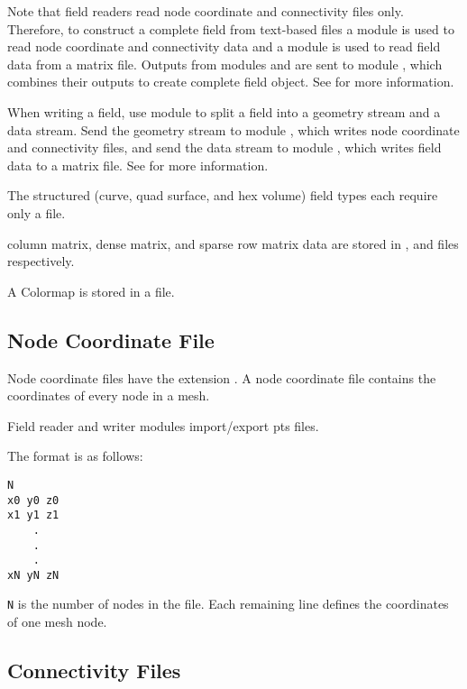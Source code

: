 Note that field readers read node coordinate and connectivity files
only.  Therefore, to construct a complete field from text-based files
a  module is used to read node coordinate and
connectivity data and a  module is used to read
field data from a matrix file.  Outputs from modules
 and  are sent to module
, which combines their outputs to create
complete field object.  See 
for more information.

When writing a field, use module  to split a
field into a geometry stream and a data stream.  Send the geometry
stream to module , which writes node coordinate
and connectivity files, and send the data stream to module
, which writes field data to a matrix file.  See
 for more information.

The structured (curve, quad surface, and hex volume) field types each
require only a  file.

\sr{} column matrix, dense matrix, and sparse row matrix data are
stored in ,  and  files respectively.

A Colormap is stored in a  file.

\subsection{Node Coordinate File}
\label{sec:node_loc_fmt}

Node coordinate files have the extension .  A node
coordinate file contains the coordinates of every node in a mesh.

Field reader and writer modules import/export pts files.

The format is as follows:

\begin{verbatim}
N
x0 y0 z0
x1 y1 z1
    .
    .
    .
xN yN zN
\end{verbatim}

\verb|N| is the number of nodes in the file.  Each remaining line
defines the coordinates of one mesh node.

\subsection{Connectivity Files}
\label{sec:node_conn_fmt}

